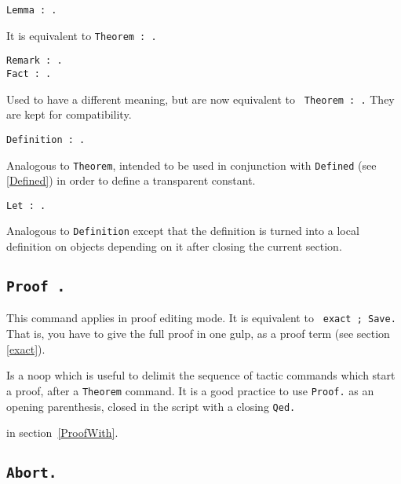 \begin{Variants}

\item {\tt Lemma {\ident} : {\form}.}

  It is equivalent to {\tt Theorem {\ident} : {\form}.}

\item {\tt Remark {\ident} : {\form}.}\\
  {\tt Fact {\ident} : {\form}.}

  Used to have a different meaning, but are now equivalent to {\tt
  Theorem {\ident} : {\form}.} They are kept for compatibility.

\item {\tt Definition {\ident} : {\form}.}

  Analogous to {\tt Theorem}, intended to be used in conjunction with
  {\tt Defined} (see \ref{Defined}) in order to define a
  transparent constant.

\item {\tt Let {\ident} : {\form}.}

  Analogous to {\tt Definition} except that the definition is turned
  into a local definition on objects depending on it after closing the
  current section.
\end{Variants}

\subsection[\tt Proof {\term}.]{\tt Proof {\term}.
\label{BeginProof}}
This command applies in proof editing mode. It is equivalent to {\tt
  exact {\term}; Save.} That is, you have to give the full proof in
one gulp, as a proof term (see section \ref{exact}).

  
  Is a noop which is useful to delimit the sequence of tactic commands
  which start a proof, after a {\tt Theorem} command.  It is a good
  practice to use {\tt Proof.} as an opening parenthesis, closed in
  the script with a closing {\tt Qed.}

 in section~\ref{ProofWith}.

\subsection[\tt Abort.]{\tt Abort.}

